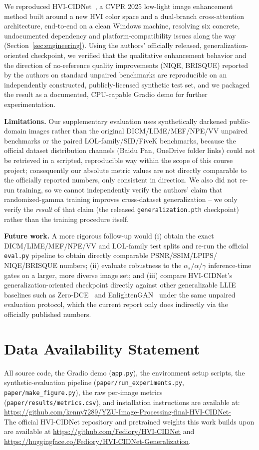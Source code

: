 \documentclass[conference]{IEEEtran}
\begin{document}
We reproduced HVI-CIDNet~\cite{yan2025hvi,feng2024hvi}, a CVPR 2025 low-light
image enhancement method built around a new HVI color space and a dual-branch
cross-attention architecture, end-to-end on a clean Windows machine,
resolving six concrete, undocumented dependency and platform-compatibility
issues along the way (Section~\ref{sec:engineering}). Using the authors'
officially released, generalization-oriented checkpoint, we verified that the
qualitative enhancement behavior and the direction of no-reference quality
improvements (NIQE, BRISQUE) reported by the authors on standard unpaired
benchmarks are reproducible on an independently constructed,
publicly-licensed synthetic test set, and we packaged the result as a
documented, CPU-capable Gradio demo for further experimentation.

\textbf{Limitations.} Our supplementary evaluation uses synthetically
darkened public-domain images rather than the original DICM/LIME/MEF/NPE/VV
unpaired benchmarks or the paired LOL-family/SID/FiveK benchmarks, because
the official dataset distribution channels (Baidu Pan, OneDrive folder links)
could not be retrieved in a scripted, reproducible way within the scope of
this course project; consequently our absolute metric values are not
directly comparable to the officially reported numbers, only consistent in
direction. We also did not re-run training, so we cannot independently
verify the authors' claim that randomized-gamma training improves
cross-dataset generalization -- we only verify the \emph{result} of that
claim (the released \texttt{generalization.pth} checkpoint) rather than the
training procedure itself.

\textbf{Future work.} A more rigorous follow-up would (i) obtain the exact
DICM/LIME/MEF/NPE/VV and LOL-family test splits and re-run the official
\texttt{eval.py} pipeline to obtain directly comparable PSNR/SSIM/LPIPS/
NIQE/BRISQUE numbers; (ii) evaluate robustness to the $\alpha_s/\alpha/\gamma$
inference-time gates on a larger, more diverse image set; and (iii) compare
HVI-CIDNet's generalization-oriented checkpoint directly against other
generalizable LLIE baselines such as Zero-DCE~\cite{guo2020zerodce} and
EnlightenGAN~\cite{jiang2021enlightengan} under the same unpaired evaluation
protocol, which the current report only does indirectly via the officially
published numbers.

\section*{Data Availability Statement}
All source code, the Gradio demo (\texttt{app.py}), the environment setup
scripts, the synthetic-evaluation pipeline
(\texttt{paper/run\_experiments.py}, \texttt{paper/make\_figure.py}), the raw
per-image metrics (\texttt{paper/results/metrics.csv}), and installation
instructions are available at:\\
\url{https://github.com/kenny7289/YZU-Image-Processing-final-HVI-CIDNet-}
\\
The official HVI-CIDNet repository and pretrained weights this work builds
upon are available at \url{https://github.com/Fediory/HVI-CIDNet} and
\url{https://huggingface.co/Fediory/HVI-CIDNet-Generalization}.



\end{document}
